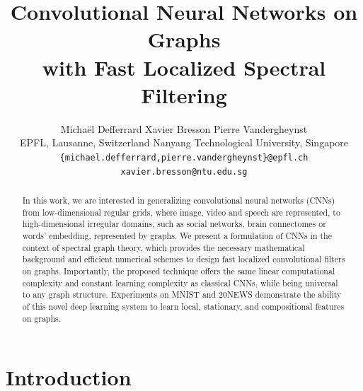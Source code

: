 \documentclass{article}
\title{Convolutional Neural Networks on Graphs\\
with Fast Localized Spectral Filtering\\}
\author{
	Michaël Defferrard\affe \hspace{1cm} Xavier Bresson\affs \hspace{1cm} Pierre Vandergheynst\affe %
	\vspace{0.2cm} \\
	\affe EPFL, Lausanne, Switzerland \hspace{1cm} \affs Nanyang Technological University, Singapore \\
	\texttt{\{michael.defferrard,pierre.vandergheynst\}@epfl.ch \hfill xavier.bresson@ntu.edu.sg} \\
}
\begin{document}
\maketitle

\begin{abstract}

In this work, we are interested in generalizing convolutional neural networks
(CNNs) from low-dimensional regular grids, where image, video and speech are
represented, to high-dimensional irregular domains, such as social networks,
brain connectomes or words’ embedding, represented by graphs.
We present a formulation of CNNs in the context of spectral graph theory, which
provides the necessary mathematical background and efficient numerical schemes
to design fast localized convolutional filters on graphs. Importantly, the
proposed technique offers the same linear computational complexity and constant
learning complexity as classical CNNs, while being universal to any graph
structure. Experiments on MNIST and 20NEWS demonstrate the ability of this
novel deep learning system to learn local, stationary, and compositional
features on graphs.

	
\end{abstract}


\section{Introduction}


\end{document}
